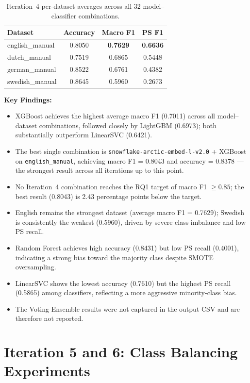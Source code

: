 \documentclass[11pt, titlepage, bibliography=totoc]{scrreprt}
\begin{document}
\begin{table}[htbp]
\centering
\caption{Iteration~4 per-dataset averages across all 32 model--classifier combinations.}
\label{tab:results-iter4-datasets}
\begin{tabular}{@{}lccc@{}}
\toprule
\textbf{Dataset} & \textbf{Accuracy} & \textbf{Macro F1} & \textbf{PS F1} \\
\midrule
english\_manual  & 0.8050 & \textbf{0.7629} & \textbf{0.6636} \\
dutch\_manual    & 0.7519 & 0.6865 & 0.5448 \\
german\_manual   & 0.8522 & 0.6761 & 0.4382 \\
swedish\_manual  & 0.8645 & 0.5960 & 0.2673 \\
\bottomrule
\end{tabular}
\end{table}

\textbf{Key Findings:}
\begin{itemize}
    \item XGBoost achieves the highest average macro F1 (0.7011) across all model--dataset combinations, followed closely by LightGBM (0.6973); both substantially outperform LinearSVC (0.6421).
    \item The best single combination is \texttt{snowflake-arctic-embed-l-v2.0} + XGBoost on \texttt{english\_manual}, achieving macro F1 = 0.8043 and accuracy = 0.8378 — the strongest result across all iterations up to this point.
    \item No Iteration~4 combination reaches the RQ1 target of macro F1 $\geq 0.85$; the best result (0.8043) is 2.43 percentage points below the target.
    \item English remains the strongest dataset (average macro F1 = 0.7629); Swedish is consistently the weakest (0.5960), driven by severe class imbalance and low PS recall.
    \item Random Forest achieves high accuracy (0.8431) but low PS recall (0.4001), indicating a strong bias toward the majority class despite SMOTE oversampling.
    \item LinearSVC shows the lowest accuracy (0.7610) but the highest PS recall (0.5865) among classifiers, reflecting a more aggressive minority-class bias.
    \item The Voting Ensemble results were not captured in the output CSV and are therefore not reported.
\end{itemize}

\section{Iteration 5 and 6: Class Balancing Experiments}
\end{document}
